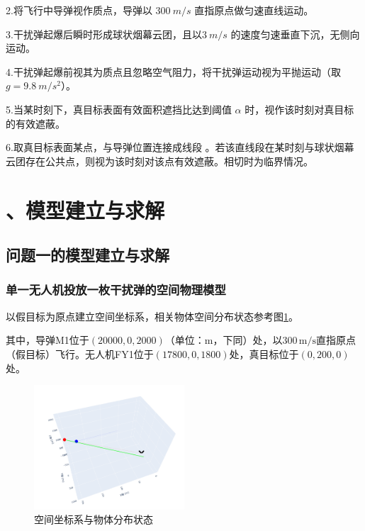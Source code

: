 \documentclass[12pt]{article}
\begin{document}
\begin{CJK}{UTF8}{gbsn}
		2.将飞行中导弹视作质点，导弹以 \(\SI{300}{m/s}\) 直指原点做匀速直线运动。
		
		3.干扰弹起爆后瞬时形成球状烟幕云团，且以\(\SI{3}{m/s}\) 的速度匀速垂直下沉，无侧向运动。
		
		4.干扰弹起爆前视其为质点且忽略空气阻力，将干扰弹运动视为平抛运动（取\(g = \SI{9.8}{m/s^2}\)）。
		
		5.当某时刻下，真目标表面有效面积遮挡比达到阈值 \(\alpha\) 时，视作该时刻对真目标的有效遮蔽。
		
		6.取真目标表面某点，与导弹位置连接成线段 。若该直线段在某时刻与球状烟幕云团存在公共点，则视为该时刻对该点有效遮蔽。相切时为临界情况。
		
		
		

		
		\section{、模型建立与求解}
		
		\subsection{问题一的模型建立与求解}
		
		\subsubsection{单一无人机投放一枚干扰弹的空间物理模型}
		
		以假目标为原点建立空间坐标系，相关物体空间分布状态参考图\ref{fig:spatial_distribution}。
		
		其中，导弹M1位于$(20000,0,2000)$（单位：m，下同）处，以$300\,\mathrm{m/s}$直指原点（假目标）飞行。无人机FY1位于$(17800,0,1800)$处，真目标位于$(0,200,0)$处。
		
		\begin{figure}[H]
			\centering
			\includegraphics[width=0.5\textwidth]{pic/Fg1.png}
			\caption{空间坐标系与物体分布状态}
			\label{fig:spatial_distribution}
		\end{figure}
		

\end{CJK}
\end{document}
